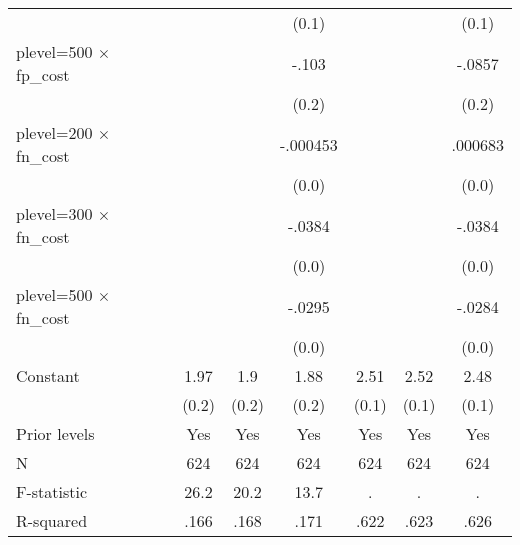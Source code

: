 \begin{table}[htbp]
\begin{tabular}{l*{6}{c}}
                &                  &                  &    (0.1)         &                  &                  &    (0.1)         \\
plevel=500 $\times$ fp\_cost&                  &                  &    -.103         &                  &                  &   -.0857         \\
                &                  &                  &    (0.2)         &                  &                  &    (0.2)         \\
plevel=200 $\times$ fn\_cost&                  &                  & -.000453         &                  &                  &  .000683         \\
                &                  &                  &    (0.0)         &                  &                  &    (0.0)         \\
plevel=300 $\times$ fn\_cost&                  &                  &   -.0384\sym{*}  &                  &                  &   -.0384\sym{*}  \\
                &                  &                  &    (0.0)         &                  &                  &    (0.0)         \\
plevel=500 $\times$ fn\_cost&                  &                  &   -.0295         &                  &                  &   -.0284         \\
                &                  &                  &    (0.0)         &                  &                  &    (0.0)         \\
Constant        &     1.97\sym{***}&      1.9\sym{***}&     1.88\sym{***}&     2.51\sym{***}&     2.52\sym{***}&     2.48\sym{***}\\
                &    (0.2)         &    (0.2)         &    (0.2)         &    (0.1)         &    (0.1)         &    (0.1)         \\
Prior levels    &      Yes         &      Yes         &      Yes         &      Yes         &      Yes         &      Yes         \\
\hline
N               &      624         &      624         &      624         &      624         &      624         &      624         \\
F-statistic     &     26.2         &     20.2         &     13.7         &        .         &        .         &        .         \\
R-squared       &     .166         &     .168         &     .171         &     .622         &     .623         &     .626         \\

\end{tabular}
\end{table}
